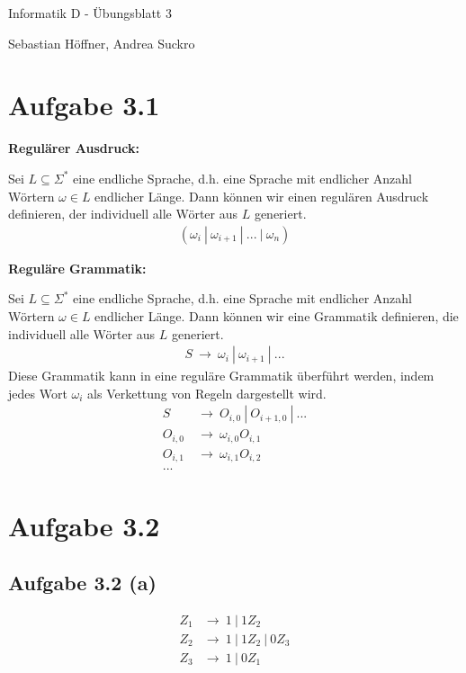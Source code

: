 \documentclass{article}
\begin{document}
\begin{center}
  \Large{Informatik D - Übungsblatt 3}

  \large{Sebastian Höffner, Andrea Suckro}
\end{center}



\section*{Aufgabe 3.1}
\textbf{Regulärer Ausdruck:}

Sei $L \subseteq \Sigma^{*}$ eine endliche Sprache, d.h. eine Sprache mit endlicher Anzahl Wörtern $\omega \in L$ endlicher Länge. Dann können wir einen regulären Ausdruck definieren, der individuell alle Wörter aus $L$ generiert.
\begin{align*}
\left(\omega_i\ |\ \omega_{i+1}\ |\ ...\ |\ \omega_n \right)
\end{align*}

\textbf{Reguläre Grammatik:}

Sei $L \subseteq \Sigma^{*}$ eine endliche Sprache, d.h. eine Sprache mit endlicher Anzahl Wörtern $\omega \in L$ endlicher Länge. Dann können wir eine Grammatik definieren, die individuell alle Wörter aus $L$ generiert.
\begin{align*}
S\ \rightarrow\ \omega_i\ |\ \omega_{i+1}\ |\ ...
\end{align*}
Diese Grammatik kann in eine reguläre Grammatik überführt werden, indem jedes Wort $\omega_i$ als Verkettung von Regeln dargestellt wird.
\begin{align*}
S\ &\rightarrow\ O_{i,0}\ |\ O_{i+1,0}\ |\ ...\\
O_{i,0}\ &\rightarrow\ \omega_{i,0} O_{i,1} \\
O_{i,1}\ &\rightarrow\ \omega_{i,1} O_{i,2} \\
...
\end{align*}


\section*{Aufgabe 3.2}
\subsection*{Aufgabe 3.2 (a)}
\begin{align*}
Z_1 &\rightarrow\ 1\ |\ 1Z_2 \\
Z_2 &\rightarrow\ 1\ |\ 1Z_2\ |\ 0Z_3 \\
Z_3 &\rightarrow\ 1\ |\ 0Z_1
\end{align*}
\end{document}
